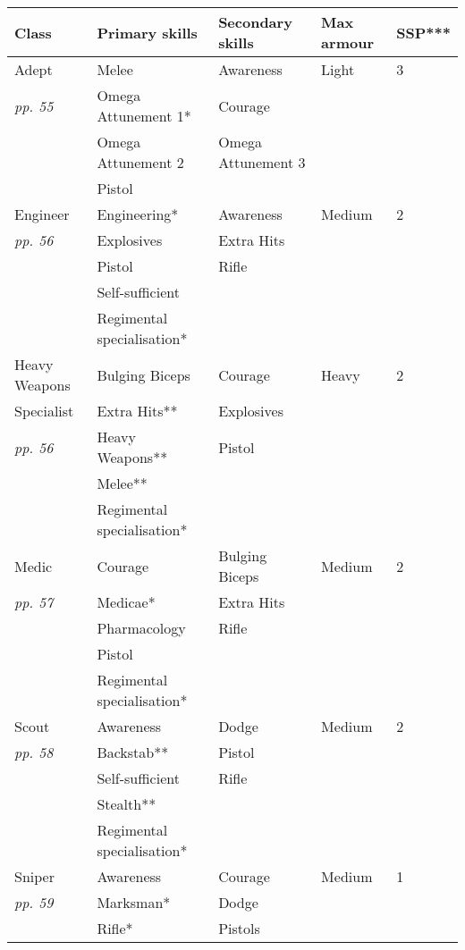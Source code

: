 \documentclass{scrbook}
\begin{document}
\begin{table}
\begin{tabular}{|l|l|l|l|l|} \hline 
Class & Primary skills & Secondary skills & Max armour & SSP*** \\
 \hline Adept & Melee & Awareness & Light & 3 \\
 \hline \textit{pp. 55} & Omega Attunement 1* & Courage &  &  \\
 \hline  & Omega Attunement 2 & Omega Attunement 3 &  &  \\
 \hline  & Pistol &  &  &  \\
 \hline Engineer & Engineering* & Awareness & Medium & 2 \\
 \hline \textit{pp. 56} & Explosives & Extra Hits &  &  \\
 \hline  & Pistol & Rifle &  &  \\
 \hline  & Self-sufficient &  &  &  \\
 \hline  & Regimental specialisation* &  &  &  \\
 \hline Heavy Weapons & Bulging Biceps & Courage & Heavy & 2 \\
 \hline Specialist & Extra Hits** & Explosives &  &  \\
 \hline \textit{pp. 56} & Heavy Weapons** & Pistol &  &  \\
 \hline  & Melee** &  &  &  \\
 \hline  & Regimental specialisation* &  &  &  \\
 \hline Medic & Courage & Bulging Biceps & Medium & 2 \\
 \hline \textit{pp. 57} & Medicae* & Extra Hits &  &  \\
 \hline  & Pharmacology & Rifle &  &  \\
 \hline  & Pistol &  &  &  \\
 \hline  & Regimental specialisation* &  &  &  \\
 \hline Scout & Awareness & Dodge & Medium & 2 \\
 \hline \textit{pp. 58} & Backstab** & Pistol &  &  \\
 \hline  & Self-sufficient & Rifle &  &  \\
 \hline  & Stealth** &  &  &  \\
 \hline  & Regimental specialisation* &  &  &  \\
 \hline Sniper & Awareness & Courage & Medium & 1 \\
 \hline \textit{pp. 59} & Marksman* & Dodge &  &  \\
 \hline  & Rifle* & Pistols &  &  \\

\end{tabular}
\end{table}
\end{document}
